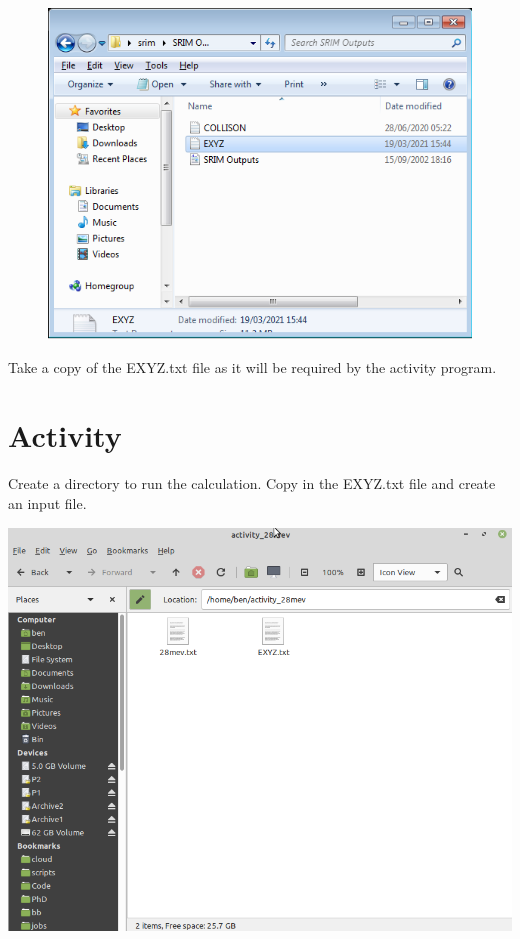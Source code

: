 \documentclass[12pt,twoside]{manual}
\begin{document}
\begin{figure}[h]
  \begin{center}
    \includegraphics[scale=0.60]{img/srim3}
  \end{center}
\end{figure}

\FloatBarrier

Take a copy of the EXYZ.txt file as it will be required by the activity program.

\section{Activity}

Create a directory to run the calculation.  Copy in the EXYZ.txt file and create an input file.


  \begin{center}
    \includegraphics[scale=0.40]{img/activityexample1}
  \end{center}
\end{document}
